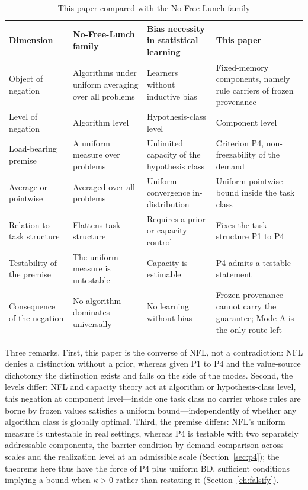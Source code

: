\begin{table}[t]
\caption{This paper compared with the No-Free-Lunch family}
\label{tab:nfl}
\centering
\small
\begin{tabular}{@{}>{\raggedright\arraybackslash}p{}>{\raggedright\arraybackslash}p{}>{\raggedright\arraybackslash}p{}>{\raggedright\arraybackslash}p{}@{}}
\hline
\textbf{Dimension} & \textbf{No-Free-Lunch family} & \textbf{Bias necessity in statistical learning} & \textbf{This paper}\\
\hline
Object of negation & Algorithms under uniform averaging over all problems & Learners without inductive bias & Fixed-memory components, namely rule carriers of frozen provenance\\
\hline
Level of negation & Algorithm level & Hypothesis-class level & Component level\\
\hline
Load-bearing premise & A uniform measure over problems & Unlimited capacity of the hypothesis class & Criterion P4, non-freezability of the demand\\
\hline
Average or pointwise & Averaged over all problems & Uniform convergence in-distribution & Uniform pointwise bound inside the task class\\
\hline
Relation to task structure & Flattens task structure & Requires a prior or capacity control & Fixes the task structure P1 to P4\\
\hline
Testability of the premise & The uniform measure is untestable & Capacity is estimable & P4 admits a testable statement\\
\hline
Consequence of the negation & No algorithm dominates universally & No learning without bias & Frozen provenance cannot carry the guarantee; Mode A is the only route left\\
\hline
\end{tabular}
\end{table}

Three remarks. First, this paper is the converse of NFL, not a contradiction: NFL denies a distinction without a prior, whereas given P1 to P4 and the value-source dichotomy the distinction exists and falls on the side of the modes. Second, the levels differ: NFL and capacity theory act at algorithm or hypothesis-class level, this negation at component level---inside one task class no carrier whose rules are borne by frozen values satisfies a uniform bound---independently of whether any algorithm class is globally optimal. Third, the premise differs: NFL's uniform measure is untestable in real settings, whereas P4 is testable with two separately addressable components, the barrier condition by demand comparison across scales and the realization level at an admissible scale (Section~\ref{sec:p4}); the theorems here thus have the force of P4 plus uniform BD, sufficient conditions implying a bound when $\kappa>0$ rather than restating it (Section~\ref{ch:falsify}).

